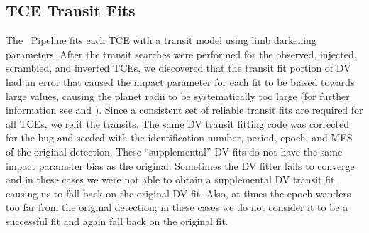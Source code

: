 \subsection{TCE Transit Fits}
\label{s:fits}
The \Kepler\ Pipeline fits each TCE with a \citet{Mandel2002} transit model using \citet{Claret2000} limb darkening parameters. After the transit searches were performed for the observed, injected, scrambled, and inverted TCEs, we discovered that the transit fit portion of DV had an error that caused the impact parameter for each fit to be biased towards large values, causing the planet radii to be systematically too large (for further information see \citealt{Christiansen2017} and \citealt{Coughlin2017a}). Since a consistent set of reliable transit fits are required for all TCEs, we refit the transits.  The same DV transit fitting code was corrected for the bug and seeded with the \Kepler{} identification number, period, epoch, and MES of the original detection. These ``supplemental'' DV fits do not have the same impact parameter bias as the original.  Sometimes the DV fitter fails to converge and in these cases we were not able to obtain a supplemental DV transit fit, causing us to fall back on the original DV fit. Also, at times the epoch wanders too far from the original detection; in these cases we do not consider it to be a successful fit and again fall back on the original fit.

